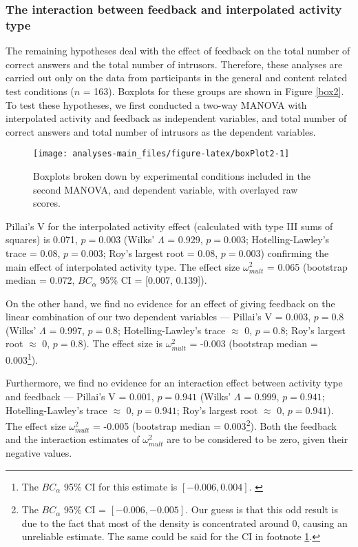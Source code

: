 \documentclass[11pt,]{article}
\let\rmarkdownfootnote\footnote%
\def\footnote{\protect\rmarkdownfootnote}
\begin{document}
\hypertarget{the-interaction-between-feedback-and-interpolated-activity-type}{%
\subsubsection{The interaction between feedback and interpolated
activity
type}\label{the-interaction-between-feedback-and-interpolated-activity-type}}

The remaining hypotheses deal with the effect of feedback on the total
number of correct answers and the total number of intrusors. Therefore,
these analyses are carried out only on the data from participants in the
general and content related test conditions (\(n\) = 163). Boxplots for
these groups are shown in Figure \ref{box2}. To test these hypotheses,
we first conducted a two-way MANOVA with interpolated activity and
feedback as independent variables, and total number of correct answers
and total number of intrusors as the dependent variables.

\begin{figure*}[h]

{\centering \texttt{[image: analyses-main\_files/figure-latex/boxPlot2-1]} 

}

\caption{\label{box2} Boxplots broken down by experimental conditions included in the second MANOVA, and dependent variable, with overlayed raw scores.}\label{fig:boxPlot2}
\end{figure*}

Pillai's V for the interpolated activity effect (calculated with type
III sums of squares) is 0.071, \(p = 0.003\) (Wilks' \(\Lambda\) =
0.929, \(p = 0.003\); Hotelling-Lawley's trace = 0.08, \(p = 0.003\);
Roy's largest root = 0.08, \(p = 0.003\)) confirming the main effect of
interpolated activity type. The effect size \(\omega^2_{mult}\) = 0.065
(bootstrap median = 0.072, \(BC_\alpha\) 95\% CI = {[}0.007, 0.139{]}).

On the other hand, we find no evidence for an effect of giving feedback
on the linear combination of our two dependent variables --- Pillai's V
= 0.003, \(p = 0.8\) (Wilks' \(\Lambda\) = 0.997, \(p = 0.8\);
Hotelling-Lawley's trace \(\approx\) 0, \(p = 0.8\); Roy's largest root
\(\approx\) 0, \(p = 0.8\)). The effect size is \(\omega^2_{mult}\) =
-0.003 (bootstrap median = 0.003\footnote{
The \(BC_\alpha\) 95\% CI for this estimate is \([-0.006, 0.004]\).
\label{bca-ref}}).

Furthermore, we find no evidence for an interaction effect between
activity type and feedback --- Pillai's V = 0.001, \(p = 0.941\) (Wilks'
\(\Lambda\) = 0.999, \(p = 0.941\); Hotelling-Lawley's trace \(\approx\)
0, \(p = 0.941\); Roy's largest root \(\approx\) 0, \(p = 0.941\)). The
effect size \(\omega^2_{mult}\) = -0.005 (bootstrap median =
0.003\footnote{
The \(BC_\alpha\) 95\% CI = \([-0.006, -0.005]\).
Our guess is that this odd result is due to the fact that most of the density is concentrated
around 0, causing an unreliable estimate. The same could be said for the CI in
footnote \ref{bca-ref}.}). Both the feedback and the interaction
estimates of \(\omega^2_{mult}\) are to be considered to be zero, given
their negative values.
\end{document}
